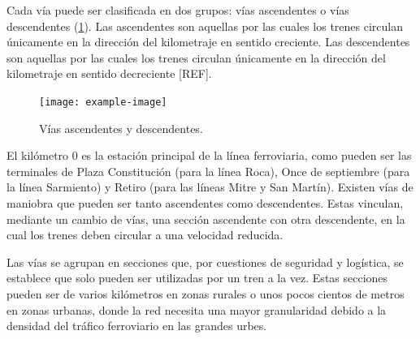 Cada vía puede ser clasificada en dos grupos: vías ascendentes o vías descendentes (\ref{fig:vias_2}). Las ascendentes son aquellas por las cuales los trenes circulan únicamente en la dirección del kilometraje en sentido creciente. Las descendentes son aquellas por las cuales los trenes circulan únicamente en la dirección del kilometraje en sentido decreciente [REF]. 

    \begin{figure}[!h]
        \centering
        \texttt{[image: example-image]}
        \centering\caption{Vías ascendentes y descendentes.}
        \label{fig:vias_2}
    \end{figure}

El kilómetro 0 es la estación principal de la línea ferroviaria, como pueden ser las terminales de Plaza Constitución (para la línea Roca), Once de septiembre (para la línea Sarmiento) y Retiro (para las líneas Mitre y San Martín).  Existen vías de maniobra que pueden ser tanto ascendentes como descendentes. Estas vinculan, mediante un cambio de vías, una sección ascendente con otra descendente, en la cual los trenes deben circular a una velocidad reducida. 

Las vías se agrupan en secciones que, por cuestiones de seguridad y logística, se establece que solo pueden ser utilizadas por un tren a la vez. Estas secciones pueden ser de varios kilómetros en zonas rurales o unos pocos cientos de metros en zonas urbanas, donde la red necesita una mayor granularidad debido a la densidad del tráfico ferroviario en las grandes urbes.